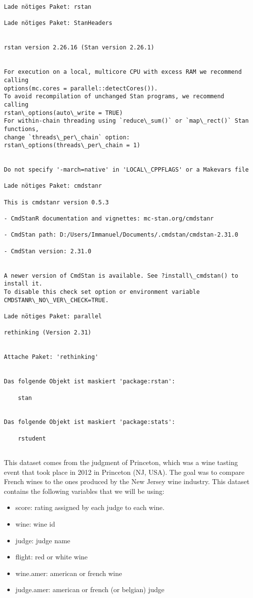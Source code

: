 \documentclass[11pt]{article}
\providecommand{\tightlist}{%
      \setlength{\itemsep}{0pt}\setlength{\parskip}{0pt}}
\begin{document}
    \begin{Verbatim}[commandchars=\\\{\}]
Lade nötiges Paket: rstan

Lade nötiges Paket: StanHeaders


rstan version 2.26.16 (Stan version 2.26.1)


For execution on a local, multicore CPU with excess RAM we recommend calling
options(mc.cores = parallel::detectCores()).
To avoid recompilation of unchanged Stan programs, we recommend calling
rstan\_options(auto\_write = TRUE)
For within-chain threading using `reduce\_sum()` or `map\_rect()` Stan functions,
change `threads\_per\_chain` option:
rstan\_options(threads\_per\_chain = 1)


Do not specify '-march=native' in 'LOCAL\_CPPFLAGS' or a Makevars file

Lade nötiges Paket: cmdstanr

This is cmdstanr version 0.5.3

- CmdStanR documentation and vignettes: mc-stan.org/cmdstanr

- CmdStan path: D:/Users/Immanuel/Documents/.cmdstan/cmdstan-2.31.0

- CmdStan version: 2.31.0


A newer version of CmdStan is available. See ?install\_cmdstan() to install it.
To disable this check set option or environment variable
CMDSTANR\_NO\_VER\_CHECK=TRUE.

Lade nötiges Paket: parallel

rethinking (Version 2.31)


Attache Paket: 'rethinking'


Das folgende Objekt ist maskiert 'package:rstan':

    stan


Das folgende Objekt ist maskiert 'package:stats':

    rstudent


    \end{Verbatim}

    This dataset comes from the judgment of Princeton, which was a wine
tasting event that took place in 2012 in Princeton (NJ, USA). The goal
was to compare French wines to the ones produced by the New Jersey wine
industry. This dataset contains the following variables that we will be
using:

\begin{itemize}
\tightlist
\item
  score: rating assigned by each judge to each wine.
\item
  wine: wine id
\item
  judge: judge name
\item
  flight: red or white wine
\item
  wine.amer: american or french wine
\item
  judge.amer: american or french (or belgian) judge
\end{itemize}
\end{document}
